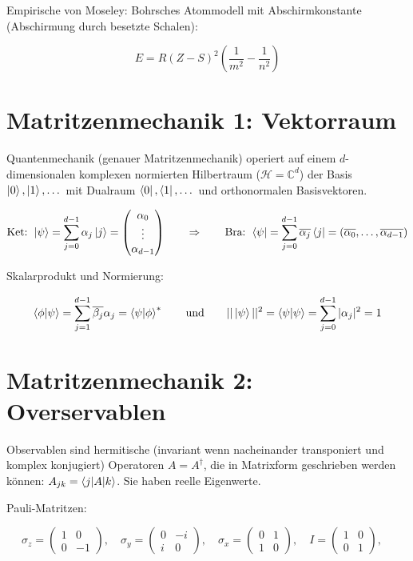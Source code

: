 \documentclass[a4paper,german,10pt,smallheadings]{scrartcl}
\begin{document}
Empirische von Moseley: Bohrsches Atommodell mit Abschirmkonstante (Abschirmung
durch besetzte Schalen):

\begin{equation*}
  E = R (Z-S)^2 \left( \frac{1}{m^2} - \frac{1}{n^2} \right)
\end{equation*}

\section{Matritzenmechanik 1: Vektorraum}
Quantenmechanik (genauer Matritzenmechanik) operiert auf einem
$d$-dimensionalen komplexen normierten Hilbertraum ($\mathcal{H} = \mathbb{C}^d$) der Basis $\ket{0}, \ket{1}, \dots$ mit
Dualraum $\bra{0}, \bra{1}, \dots$ und orthonormalen Basisvektoren.

\begin{equation*}
  \text{Ket: } \ket{\psi} = \sum_{j=0}^{d-1} \alpha_j \ket{j} = \begin{pmatrix} \alpha_0 \\ \vdots \\ \alpha_{d-1} \end{pmatrix}
  \qquad \Rightarrow \qquad
  \text{Bra: } \bra{\psi} = \sum_{j=0}^{d-1} \overline{\alpha_j} \bra{j} = (\overline{\alpha_0}, \dots, \overline{\alpha_{d-1}})
\end{equation*}

Skalarprodukt und Normierung:

\begin{equation*}
  \braket{\phi|\psi} = \sum_{j=1}^{d-1} \overline{\beta_j} \alpha_j = \braket{\psi|\phi}^*
\qquad \text{und} \qquad
  || \ket{\psi} ||^2 = \braket{\psi|\psi} = \sum_{j=0}^{d-1} |\alpha_j|^2 = 1
\end{equation*}

\newpage

\section{Matritzenmechanik 2: Overservablen}

Observablen sind hermitische (invariant wenn nacheinander transponiert und
komplex konjugiert) Operatoren $A = A^\dagger$, die in Matrixform geschrieben
werden können: $A_{jk} = \braket{j|A|k}$. Sie haben reelle Eigenwerte.

Pauli-Matritzen:

\begin{equation*}
  \sigma_z = \begin{pmatrix} 1 & 0 \\ 0 & -1\end{pmatrix}, \quad
  \sigma_y = \begin{pmatrix} 0 & -i \\ i & 0\end{pmatrix}, \quad
  \sigma_x = \begin{pmatrix} 0 & 1 \\ 1 & 0\end{pmatrix}, \quad
  I = \begin{pmatrix} 1 & 0 \\ 0 & 1\end{pmatrix}, \quad
\end{equation*}
\end{document}
